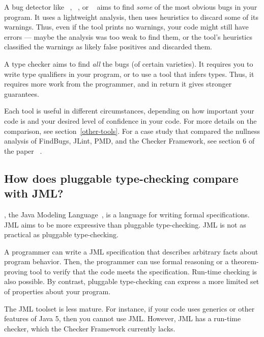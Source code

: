 A bug detector like ~\cite{HovemeyerP2004,HovemeyerSP2006},
~\cite{Artho2001}, or
~\cite{Copeland2005} aims to find \emph{some}
of the most obvious bugs in your program.  It uses a lightweight analysis,
then uses heuristics to discard some of its warnings.  Thus, even if the tool
prints no warnings, your code might still have errors --- maybe the
analysis was too weak to find them, or the tool's heuristics classified the
warnings as likely false positives and discarded them.

A type checker aims to find \emph{all} the bugs (of certain varieties).
It requires you to write type qualifiers in your program, or to use a tool
that infers types.  Thus, it requires more work from the programmer, and in
return it gives stronger guarantees.

Each tool is useful in different circumstances, depending on how important
your code is and your desired level of confidence in your code.  For more
details on the comparison, see section~\ref{other-tools}.  For a case study
that compared the nullness analysis of FindBugs, JLint, PMD, and the
Checker Framework, see section 6 of the paper
~\cite{PapiACPE2008}.


\subsection{How does pluggable type-checking compare with JML?}

, the Java Modeling
Language~\cite{LeavensBR2006:JML}, is a language for writing formal
specifications.  JML aims to be more expressive than pluggable
type-checking.  JML is not as practical as pluggable type-checking.

A programmer can write a JML specification that
describes arbitrary facts about program behavior.  Then, the programmer can
use formal reasoning or a theorem-proving tool to verify that the code
meets the specification.  Run-time checking is also possible.
By contrast, pluggable type-checking can express a more limited set of
properties about your program.

The JML toolset is less mature.  For instance, if your code uses
generics or other features of Java 5, then you cannot use JML.  
However, JML has a run-time checker, which the Checker Framework currently
lacks.



